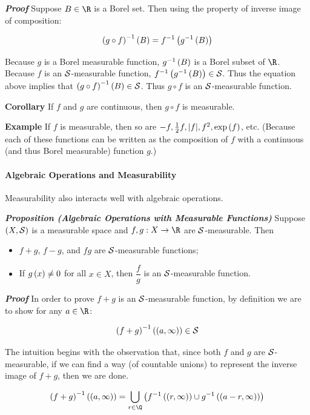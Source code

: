 \documentclass[
]{article}
\begin{document}
\emph{\textbf{Proof}} Suppose \(B\in \R\) is a Borel set. Then using the
property of inverse image of composition:

\[\pr{g\circ f}^{-1}\pr B = \inv f\pr{\inv g\pr B}\]

Because \(g\) is a Borel measurable function, \(\inv g\pr B\) is a Borel
subset of \(\R\). Because \(f\) is an \(\S\)-measurable function,
\(\inv f\pr{\inv g\pr B}\in \S\). Thus the equation above implies that
\(\pr{g\circ f}^{-1}\pr B\in \S\). Thus \(g\circ f\) is an
\(\S\)-measurable function.

\textbf{Corollary} If \(f\) and \(g\) are continuous, then \(g\circ f\)
is measurable.

\textbf{Example} If \(f\) is measurable, then so are
\(-f,\frac12 f,|f|,f^2,\exp\pr f\), etc. (Because each of these
functions can be written as the composition of \(f\) with a continuous
(and thus Borel measurable) function \(g\).)

\hypertarget{algebraic-operations-and-measurability}{%
\paragraph{Algebraic Operations and
Measurability}\label{algebraic-operations-and-measurability}}

Measurability also interacts well with algebraic operations.

\emph{\textbf{Proposition (Algebraic Operations with Measurable
Functions)}} Suppose \(\pr{X,\S}\) is a measurable space and
\(f,g:X\to \R\) are \(\S\)-measurable. Then

\begin{itemize}
\item
  \(f+g\), \(f-g\), and \(fg\) are \(\S\)-measurable functions;
\item
  If \(g\pr x\ne 0\) for all \(x\in X\), then \(\dfrac{f}{g}\) is an
  \(\S\)-measurable function.
\end{itemize}

\emph{\textbf{Proof}} In order to prove \(f+g\) is an \(\S\)-measurable
function, by definition we are to show for any \(a\in \R\):

\[\pr{f+g}^{-1}\pr{\pr{a,\infty}}\in \S\]

The intuition begins with the observation that, since both \(f\) and
\(g\) are \(\S\)-measurable, if we can find a way (of countable unions)
to represent the inverse image of \(f+g\), then we are done.

\[\pr{f+g}^{-1}\pr{\pr{a,\infty}} = \bigcup_{r\in \Q}\pr{\inv f\pr{\pr{r,\infty}}\cup\inv g\pr{\pr{a-r,\infty}}}\]
\end{document}
